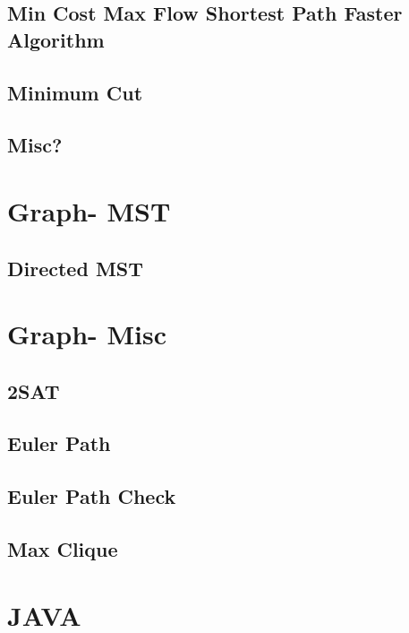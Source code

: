 \subsection{Min Cost Max Flow Shortest Path Faster Algorithm}
\raggedbottom
\hrulefill
\subsection{Minimum Cut}
\raggedbottom
\hrulefill
\subsection{Misc?}
\raggedbottom
\hrulefill

\section{Graph- MST}
\subsection{Directed MST}
\raggedbottom
\hrulefill

\section{Graph- Misc}
\subsection{2SAT}
\raggedbottom
\hrulefill
\subsection{Euler Path}
\raggedbottom
\hrulefill
\subsection{Euler Path Check}
\raggedbottom
\hrulefill
\subsection{Max Clique}
\raggedbottom
\hrulefill

\section{JAVA}
